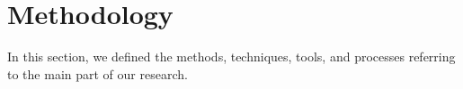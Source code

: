\section{Methodology}
\label{sec:methodology}

In this section, we defined the methods, techniques, tools, and processes referring to the main part of our research.






